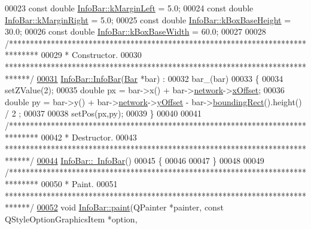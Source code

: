 \begin{DoxyCode}
00023 \textcolor{keyword}{const} \textcolor{keywordtype}{double} \hyperlink{class_info_bar_a2ed246fc7b7917ba8141b55cbd023d5c}{InfoBar::kMarginLeft} = 5.0;
00024 \textcolor{keyword}{const} \textcolor{keywordtype}{double} \hyperlink{class_info_bar_aa16c67708cd2ab938e1dc8be5f168614}{InfoBar::kMarginRight} = 5.0;
00025 \textcolor{keyword}{const} \textcolor{keywordtype}{double} \hyperlink{class_info_bar_a0f2f7b614000ae1d317ec3819acabbf2}{InfoBar::kBoxBaseHeight} = 30.0;
00026 \textcolor{keyword}{const} \textcolor{keywordtype}{double} \hyperlink{class_info_bar_a3eb5cc879199e1a927ed76eb989c4c0e}{InfoBar::kBoxBaseWidth} = 60.0;
00027 
00028 \textcolor{comment}{/*******************************************************************************}
00029 \textcolor{comment}{ * Constructor.}
00030 \textcolor{comment}{ ******************************************************************************/}
\hypertarget{infobar_8cpp_source_l00031}{}\hyperlink{class_info_bar_aab5c08f226901c8827a97efbdfb5122a}{00031} \hyperlink{class_info_bar_aab5c08f226901c8827a97efbdfb5122a}{InfoBar::InfoBar}(\hyperlink{class_bar}{Bar} *bar) :
00032   bar\_(bar)
00033 \{
00034   setZValue(2);
00035   \textcolor{keywordtype}{double} px = bar->x() + bar->\hyperlink{class_bar_a80025f13884750add58cc61b318357ff}{network}->\hyperlink{class_network_a9f5c70be28a45320802bd0ac3947d114}{xOffset};
00036   \textcolor{keywordtype}{double} py = bar->y() + bar->\hyperlink{class_bar_a80025f13884750add58cc61b318357ff}{network}->\hyperlink{class_network_a771b16f7eb4459d0ca7141c048b1ab59}{yOffset} - bar->\hyperlink{group___models_ga8279d8109019cc7e139e2023690496be}{boundingRect}().height() / 2
      ;
00037 
00038   setPos(px,py);
00039 \}
00040 
00041 \textcolor{comment}{/*******************************************************************************}
00042 \textcolor{comment}{ * Destructor.}
00043 \textcolor{comment}{ ******************************************************************************/}
\hypertarget{infobar_8cpp_source_l00044}{}\hyperlink{class_info_bar_a954baa28d750739c80c029818d267d8e}{00044} \hyperlink{class_info_bar_a954baa28d750739c80c029818d267d8e}{InfoBar::~InfoBar}()
00045 \{
00046 
00047 \}
00048 
00049 \textcolor{comment}{/*******************************************************************************}
00050 \textcolor{comment}{ * Paint.}
00051 \textcolor{comment}{ ******************************************************************************/}
\hypertarget{infobar_8cpp_source_l00052}{}\hyperlink{class_info_bar_afa011ce96bb99021d2cbf5b24c7276bb}{00052} \textcolor{keywordtype}{void} \hyperlink{class_info_bar_afa011ce96bb99021d2cbf5b24c7276bb}{InfoBar::paint}(QPainter *painter, \textcolor{keyword}{const} QStyleOptionGraphicsItem *option,

\end{DoxyCode}
